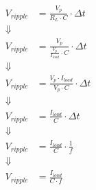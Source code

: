 \begin{align}
V_{ ripple } &= \frac{ V_p } {R_L \cdot C}\cdot \Delta t \\
\Downarrow \nonumber \\
V_{ ripple } &= \frac{ V_{ p } } { \frac{ V_{ p } }{ I_{ load } } \cdot C } \cdot \Delta t \nonumber \\
\Downarrow \nonumber \\
V_{ ripple } &= \frac{ V_{ p } \cdot I_{ load } } { V_{ p } \cdot C } \cdot \Delta t \nonumber \\
\Downarrow \nonumber \\
V_{ ripple } &= \frac{ I_{ load } }{ C } \cdot \Delta t \nonumber \\
\Downarrow \nonumber \\
V_{ ripple } &= \frac{ I_{ load } }{ C } \cdot \frac{ 1 }{ f } \nonumber \\
\Downarrow \nonumber \\
V_{ ripple } &= \frac{ I_{ load } }{ C \cdot f } \nonumber \\
\end{align}
